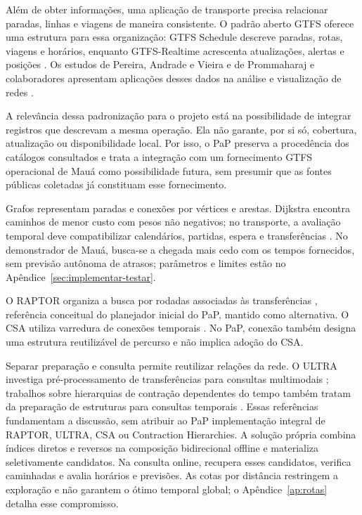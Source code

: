 \documentclass[12pt,oneside,a4paper,brazil,chapter=TITLE]{abntex2}
\begin{document}
Além de obter informações, uma aplicação de transporte precisa relacionar paradas, linhas e viagens de maneira consistente. O padrão aberto GTFS oferece uma estrutura para essa organização: GTFS Schedule descreve paradas, rotas, viagens e horários, enquanto GTFS-Realtime acrescenta atualizações, alertas e posições \citep{gtfs}. Os estudos de Pereira, Andrade e Vieira e de Prommaharaj e colaboradores apresentam aplicações desses dados na análise e visualização de redes \citep{pereira2023,prommaharaj2020}.

A relevância dessa padronização para o projeto está na possibilidade de integrar registros que descrevam a mesma operação. Ela não garante, por si só, cobertura, atualização ou disponibilidade local. Por isso, o PaP preserva a procedência dos catálogos consultados e trata a integração com um fornecimento GTFS operacional de Mauá como possibilidade futura, sem presumir que as fontes públicas coletadas já constituam esse fornecimento.

Grafos representam paradas e conexões por vértices e arestas. Dijkstra encontra caminhos de menor custo com pesos não negativos; no transporte, a avaliação temporal deve compatibilizar calendários, partidas, espera e transferências \citep{sedgewicksp,dijkstra1959,bast2015,transitplanner}. No demonstrador de Mauá, busca-se a chegada mais cedo com os tempos fornecidos, sem previsão autônoma de atrasos; parâmetros e limites estão no Apêndice~\ref{sec:implementar-testar}.

O RAPTOR organiza a busca por rodadas associadas às transferências \citep{delling2012}, referência conceitual do planejador inicial do PaP, mantido como alternativa. O CSA utiliza varredura de conexões temporais \citep{dibbelt2018}. No PaP, conexão também designa uma estrutura reutilizável de percurso e não implica adoção do CSA.

Separar preparação e consulta permite reutilizar relações da rede. O ULTRA investiga pré-processamento de transferências para consultas multimodais \citep{baum2019}; trabalhos sobre hierarquias de contração dependentes do tempo também tratam da preparação de estruturas para consultas temporais \citep{batz2013}. Essas referências fundamentam a discussão, sem atribuir ao PaP implementação integral de RAPTOR, ULTRA, CSA ou Contraction Hierarchies. A solução própria combina índices diretos e reversos na composição bidirecional offline e materializa seletivamente candidatos. Na consulta online, recupera esses candidatos, verifica caminhadas e avalia horários e previsões. As cotas por distância restringem a exploração e não garantem o ótimo temporal global; o Apêndice~\ref{ap:rotas} detalha esse compromisso.
\end{document}
